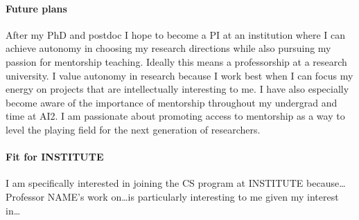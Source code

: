 \documentclass[11pt]{article}
\newcommand\inst{INSTITUTE\xspace}
\begin{document}
\paragraph{Future plans}
After my PhD and postdoc I hope to become a PI 
at an institution where I can achieve autonomy in choosing my research directions
while also pursuing my passion for mentorship teaching.
Ideally this means a professorship at a research university.
I value autonomy in research because I work best 
when I can focus my energy on projects 
that are intellectually interesting to me.
I have also especially become aware of the importance of mentorship 
throughout my undergrad and time at AI2.
I am passionate about promoting access to mentorship 
as a way to level the playing field 
for the next generation of researchers.

\paragraph{Fit for \inst} I am specifically interested in joining the CS program at 
\inst because\ldots Professor NAME's work on\ldots is particularly interesting to me given my interest in\ldots



\end{document}

